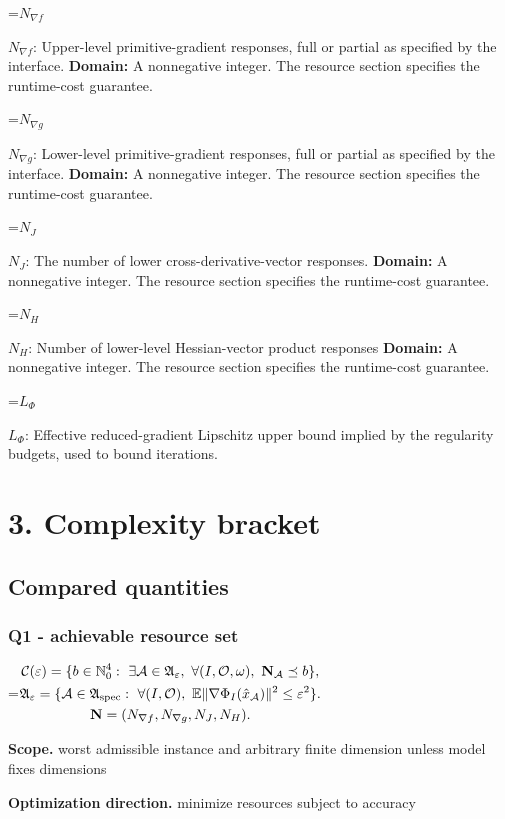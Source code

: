 \documentclass[10pt,a4paper]{article}
\newcommand{\AtlasMath}[1]{\par\begingroup\centering\setbox0=\hbox{$\displaystyle #1$}\ifdim\wd0>1.4\linewidth\typeout{ATLAS WIDE FORMULA: \the\wd0}\fi\ifdim\wd0>\linewidth\resizebox{\linewidth}{!}{\box0}\else\box0\fi\par\endgroup}
\newcommand{\AtlasInlineMath}[1]{\begingroup\setbox0=\hbox{$#1$}\ifdim\wd0>.4\linewidth\endgroup\AtlasMath{#1}\else\endgroup$#1$\fi}
\begin{document}
\AtlasInlineMath{N_{\nabla f}}: Upper-level primitive-gradient responses, full or partial as specified by the interface. \textbf{Domain:} A nonnegative integer. The resource section specifies the runtime-cost guarantee.

\AtlasInlineMath{N_{\nabla g}}: Lower-level primitive-gradient responses, full or partial as specified by the interface. \textbf{Domain:} A nonnegative integer. The resource section specifies the runtime-cost guarantee.

\AtlasInlineMath{N_J}: The number of lower cross-derivative-vector responses. \textbf{Domain:} A nonnegative integer. The resource section specifies the runtime-cost guarantee.

\AtlasInlineMath{N_H}: Number of lower-level Hessian-vector product responses \textbf{Domain:} A nonnegative integer. The resource section specifies the runtime-cost guarantee.

\AtlasInlineMath{L_\Phi}: Effective reduced-gradient Lipschitz upper bound implied by the regularity budgets, used to bound iterations.

\section{3. Complexity bracket}
\subsection{Compared quantities}
\subsubsection{Q1 - achievable resource set}
\AtlasMath{\begin{gathered}\mathcal C(\varepsilon)=\{b\in\mathbb N_0^4:\ \exists\mathcal A\in\mathfrak A_\varepsilon,\ \forall(I,\mathcal O,\omega),\ \mathbf N_{\mathcal A}\preceq b\},\\\mathfrak A_\varepsilon=\{\mathcal A\in\mathfrak A_{\rm spec}:\ \forall(I,\mathcal O),\ \mathbb E\|\nabla\Phi_I(\hat x_{\mathcal A})\|^2\le\varepsilon^2\}.\\\mathbf N=(N_{\nabla f},N_{\nabla g},N_J,N_H).\end{gathered}}
\textbf{Scope.} worst admissible instance and arbitrary finite dimension unless model fixes dimensions

\textbf{Optimization direction.} minimize resources subject to accuracy
\end{document}
